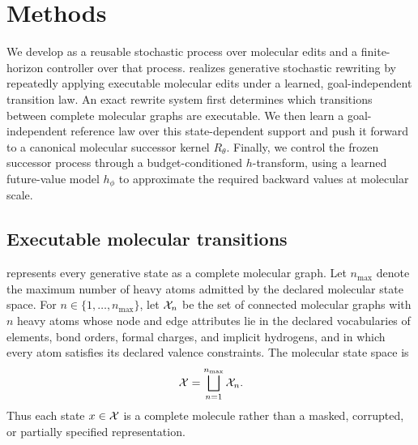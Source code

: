 \section{Methods}
\label{sec:process}

We develop \method{} as a reusable stochastic process over molecular edits and a finite-horizon controller over that process. \method{} realizes generative stochastic rewriting by repeatedly applying executable molecular edits under a learned, goal-independent transition law. An exact rewrite system first determines which transitions between complete molecular graphs are executable. We then learn a goal-independent reference law over this state-dependent support and push it forward to a canonical molecular successor kernel $R_\theta$. Finally, we control the frozen successor process through a budget-conditioned $h$-transform, using a learned future-value model $h_\phi$ to approximate the required backward values at molecular scale.

\subsection{Executable molecular transitions}
\label{sec:support}

\method{} represents every generative state as a complete molecular graph. Let $n_{\max}$ denote the maximum number of heavy atoms admitted by the declared molecular state space. For $n\in\{1,\dots,n_{\max}\}$, let $\mathcal{X}_n$ be the set of connected molecular graphs with $n$ heavy atoms whose node and edge attributes lie in the declared vocabularies of elements, bond orders, formal charges, and implicit hydrogens, and in which every atom satisfies its declared valence constraints. The molecular state space is
\begin{equation}
\mathcal{X}=\bigsqcup_{n=1}^{n_{\max}}\mathcal{X}_n.
\label{eq:statespace}
\end{equation}
Thus each state $x\in\mathcal{X}$ is a complete molecule rather than a masked, corrupted, or partially specified representation.

